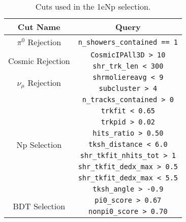 \renewcommand{\arraystretch}{1.4}
\begin{table}[H]
    \centering
    \begin{tabular}{c|c}
        \hline
        \hline
        Cut Name & Query \\
        \hline
        \hline
        \multirow{1}{*}{$\pi^0$ Rejection} & \verb|n_showers_contained == 1| \\
        \hline
        \multirow{2}{*}{Cosmic Rejection} & \verb|CosmicIPAll3D > 10| \\
        & \verb|shr_trk_len < 300| \\
        \hline
        \multirow{2}{*}{$\nu_{\mu}$ Rejection} & \verb|shrmoliereavg < 9| \\
        & \verb|subcluster > 4| \\
        \hline
        \multirow{9}{*}{Np Selection} & \verb|n_tracks_contained > 0| \\
        & \verb|trkfit < 0.65| \\
        & \verb|trkpid > 0.02| \\
        & \verb|hits_ratio > 0.50| \\
        & \verb|tksh_distance < 6.0| \\
        & \verb|shr_tkfit_nhits_tot > 1| \\
        & \verb|shr_tkfit_dedx_max > 0.5| \\
        & \verb|shr_tkfit_dedx_max < 5.5| \\
        & \verb|tksh_angle > -0.9| \\
        \hline
        \multirow{2}{*}{BDT Selection} & \verb|pi0_score > 0.67| \\ 
        & \verb|nonpi0_score > 0.70| \\
        \hline
        \end{tabular}
    \caption{Cuts used in the 1eNp selection.}
    \label{tab:1eNpSel}    
\end{table}
\renewcommand{\arraystretch}{1.0}

